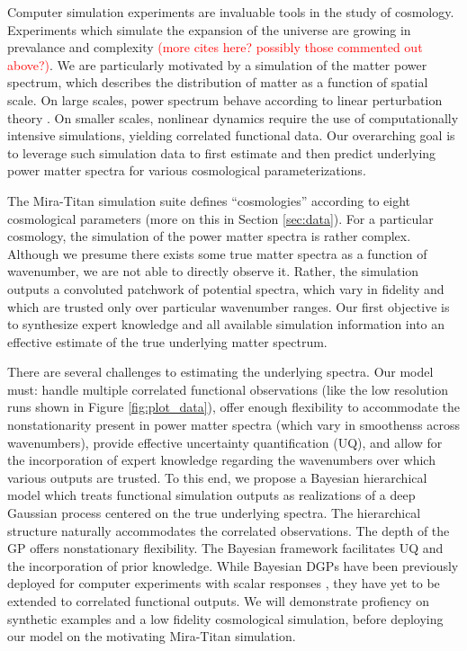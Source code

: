 \documentclass[11pt]{article}
\begin{document}
Computer simulation experiments are invaluable tools in the study of cosmology.
Experiments which simulate the expansion of the universe are growing
in prevalance and complexity \citep[e.g.,][]{lawrence2010coyote,moran2023mira}
\textcolor{red}{(more cites here? possibly those commented out above?)}.  
We are particularly motivated by a simulation
of the matter power spectrum, which describes the distribution of matter as a 
function of spatial scale. 
On large scales, power spectrum behave according to linear perturbation 
theory \citep{pietroni2008flowing, lesgourgues2009non}.  On smaller scales, nonlinear 
dynamics require the use of computationally intensive simulations, yielding
correlated functional data.
Our overarching goal is to leverage such simulation data to 
first estimate and then predict underlying power matter spectra for various 
cosmological parameterizations.


The Mira-Titan simulation suite \citep{moran2023mira}
defines ``cosmologies'' according to eight cosmological parameters (more on this
in Section \ref{sec:data}).  For a particular cosmology, the simulation of the power matter spectra 
is rather complex.  Although we presume there exists some true matter spectra as a function
of wavenumber, we are not able to directly observe it.  Rather, the simulation outputs 
a convoluted patchwork of potential spectra, which vary in fidelity and which are trusted
only over particular wavenumber ranges.  Our first objective is to synthesize expert knowledge
and all available simulation information into an effective estimate of the true underlying
matter spectrum.  

There are several challenges to estimating the underlying spectra.  Our model
must: handle multiple correlated functional observations (like the low resolution
runs shown in Figure \ref{fig:plot_data}), offer enough 
flexibility to accommodate the nonstationarity present in power matter spectra 
(which vary in smoothenss across wavenumbers), provide effective uncertainty
quantification (UQ), and allow for the incorporation of expert knowledge 
regarding the wavenumbers over which various outputs are trusted.  To this end, 
we propose a Bayesian hierarchical model which treats functional simulation 
outputs as realizations of a deep Gaussian process \citep[DGP;][]{damianou2013deep} 
centered on the true underlying spectra.  The hierarchical structure naturally
accommodates the correlated observations.  The depth of the GP offers nonstationary
flexibility.  The Bayesian framework facilitates UQ and the incorporation of prior
knowledge.  While Bayesian DGPs have been previously deployed for computer experiments 
with scalar responses \citep[e.g.,][]{sauer2023active,sauer2023vecchia,ming2023deep}, 
they have yet to be extended to correlated functional outputs. 
We will demonstrate profiency on synthetic examples and a low fidelity
cosmological simulation, before deploying our model on the motivating 
Mira-Titan simulation.
\end{document}
